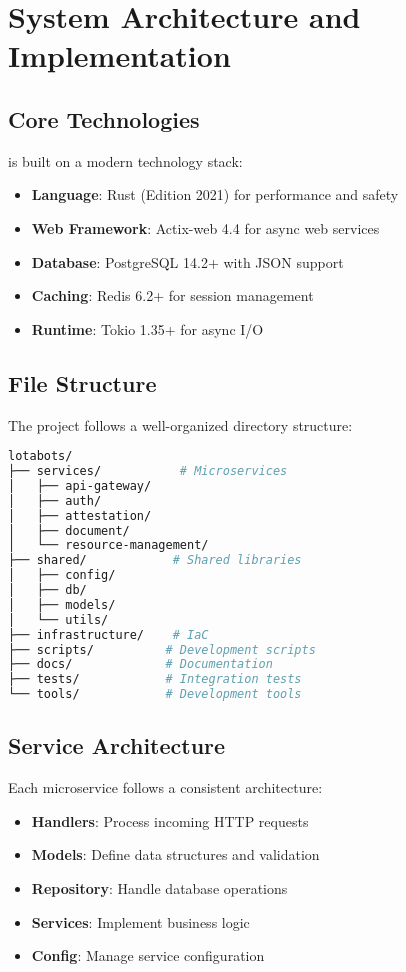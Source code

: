 \section{System Architecture and Implementation}

\subsection{Core Technologies}

\sysname{} is built on a modern technology stack:

\begin{itemize}
    \item \textbf{Language}: Rust (Edition 2021) for performance and safety
    \item \textbf{Web Framework}: Actix-web 4.4 for async web services
    \item \textbf{Database}: PostgreSQL 14.2+ with JSON support
    \item \textbf{Caching}: Redis 6.2+ for session management
    \item \textbf{Runtime}: Tokio 1.35+ for async I/O
\end{itemize}

\subsection{File Structure}

The project follows a well-organized directory structure:

\begin{lstlisting}[language=bash]
lotabots/
├── services/           # Microservices
│   ├── api-gateway/
│   ├── auth/
│   ├── attestation/
│   ├── document/
│   └── resource-management/
├── shared/            # Shared libraries
│   ├── config/
│   ├── db/
│   ├── models/
│   └── utils/
├── infrastructure/    # IaC
├── scripts/          # Development scripts
├── docs/             # Documentation
├── tests/            # Integration tests
└── tools/            # Development tools
\end{lstlisting}

\subsection{Service Architecture}

Each microservice follows a consistent architecture:

\begin{itemize}
    \item \textbf{Handlers}: Process incoming HTTP requests
    \item \textbf{Models}: Define data structures and validation
    \item \textbf{Repository}: Handle database operations
    \item \textbf{Services}: Implement business logic
    \item \textbf{Config}: Manage service configuration
\end{itemize}

